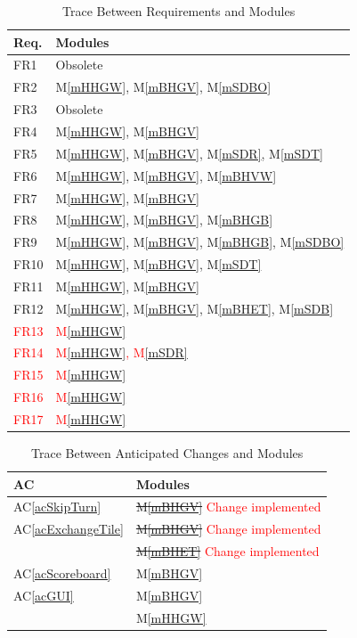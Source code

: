 \documentclass[12pt, titlepage]{article}
\newcommand{\acref}[1]{AC\ref{#1}}
\newcommand{\mref}[1]{M\ref{#1}}
\begin{document}
\begin{table}[H]
\centering
\begin{tabular}{p{} p{}}
\toprule
\textbf{Req.} & \textbf{Modules}\\
\midrule
FR1 & Obsolete \\
FR2 & \mref{mHHGW}, \mref{mBHGV}, \mref{mSDBO}\\
FR3 & Obsolete \\
FR4 & \mref{mHHGW}, \mref{mBHGV}\\
FR5 & \mref{mHHGW}, \mref{mBHGV}, \mref{mSDR}, \mref{mSDT}\\
FR6 & \mref{mHHGW}, \mref{mBHGV}, \mref{mBHVW}\\
FR7 & \mref{mHHGW}, \mref{mBHGV}\\
FR8 & \mref{mHHGW}, \mref{mBHGV}, \mref{mBHGB}\\
FR9 & \mref{mHHGW}, \mref{mBHGV}, \mref{mBHGB}, \mref{mSDBO}\\
FR10 & \mref{mHHGW}, \mref{mBHGV}, \mref{mSDT}\\
FR11 & \mref{mHHGW}, \mref{mBHGV}\\
FR12 & \mref{mHHGW}, \mref{mBHGV}, \mref{mBHET}, \mref{mSDB}\\
\textcolor{red}{FR13} & \textcolor{red}{ \mref{mHHGW}} \\
\textcolor{red}{FR14} & \textcolor{red}{\mref{mHHGW}, \mref{mSDR}} \\
\textcolor{red}{FR15} & \textcolor{red}{\mref{mHHGW}}\\
\textcolor{red}{FR16} & \textcolor{red}{\mref{mHHGW}}\\
\textcolor{red}{FR17} & \textcolor{red}{\mref{mHHGW}}\\
\bottomrule
\end{tabular}
\caption{Trace Between Requirements and Modules}
\label{TblRT}
\end{table}

\begin{table}[H]
\centering
\begin{tabular}{p{} p{}}
\toprule
\textbf{AC} & \textbf{Modules}\\
\midrule
\acref{acSkipTurn} & \sout {\mref{mBHGV}} \textcolor{red}{Change implemented}\\ %
\acref{acExchangeTile} & \sout{\mref{mBHGV}} \textcolor{red}{Change implemented}\\
& \sout{\mref{mBHET}} \textcolor{red}{Change implemented}\\ %
\acref{acScoreboard} & \mref{mBHGV}\\
\acref{acGUI} & \mref{mBHGV}\\
& \mref{mHHGW}\\
\bottomrule
\end{tabular}
\caption{Trace Between Anticipated Changes and Modules}
\label{TblACT}
\end{table}
\end{document}
